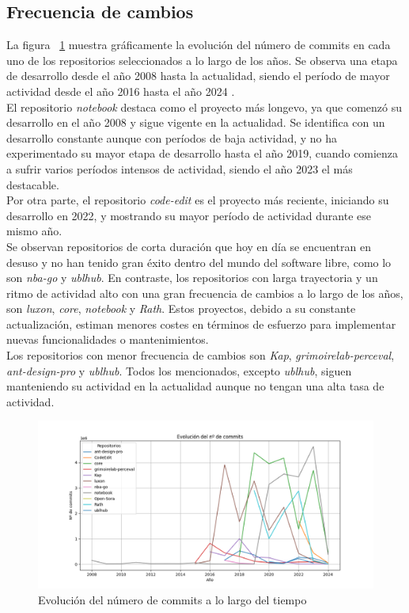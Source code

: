 \documentclass[a4paper, 12pt]{book}
\begin{document}
\subsection{Frecuencia de cambios}
\label{subsec:commits}

La figura ~\ref{fig:grafica-commits} muestra gráficamente la evolución del número de commits en cada uno de los repositorios seleccionados a lo largo de los años. Se observa una etapa de
desarrollo desde el año 2008 hasta la actualidad, siendo el período de mayor actividad desde el año 2016 hasta el año 2024 .
\\El repositorio \textit{notebook} destaca como el proyecto más longevo, ya que comenzó su desarrollo en el año 2008 y sigue vigente en la actualidad.
Se identifica con un desarrollo constante aunque con períodos de baja actividad, y no ha experimentado su mayor etapa de desarrollo hasta el año 2019, cuando comienza a sufrir varios períodos intensos de actividad,
siendo el año 2023 el más destacable.
\\Por otra parte, el repositorio \textit{code-edit} es el proyecto más reciente, iniciando su desarrollo en 2022, y mostrando su mayor período de actividad durante ese mismo año.
\\Se observan repositorios de corta duración que hoy en día se encuentran en desuso y  no han tenido gran éxito dentro del mundo del software libre, como lo son \textit{nba-go} y \textit{ublhub}.
En contraste, los repositorios con larga trayectoria y un ritmo de actividad alto con una gran frecuencia de cambios a lo largo de los años, son \textit{luxon}, \textit{core}, \textit{notebook} y
\textit{Rath}. Estos proyectos, debido a su constante actualización, estiman menores costes en términos de esfuerzo para implementar nuevas funcionalidades o mantenimientos.
\\Los repositorios con menor frecuencia de cambios son \textit{Kap}, \textit{grimoirelab-perceval}, \textit{ant-design-pro} y \textit{ublhub}. Todos los mencionados, excepto \textit{ublhub}, siguen
manteniendo su actividad en la actualidad aunque no tengan una alta tasa de actividad.


\begin{figure}
  \centering
  \includegraphics[width=16cm, keepaspectratio]{img/commits_graph.png}
  \caption{Evolución del número de commits a lo largo del tiempo}
  \label{fig:grafica-commits}
\end{figure}
\end{document}
